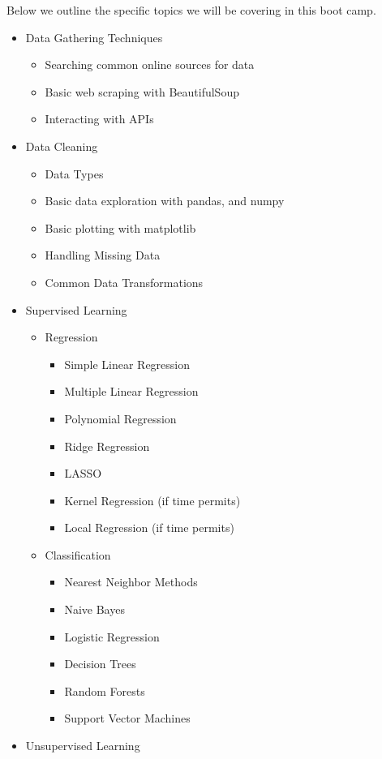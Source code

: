 \documentclass[12pt]{article}
\begin{document}
Below we outline the specific topics we will be covering in this boot camp.
\begin{itemize}
	\item Data Gathering Techniques
	\begin{itemize}
		\item Searching common online sources for data
		\item Basic web scraping with BeautifulSoup
		\item Interacting with APIs
	\end{itemize}
	\item Data Cleaning
	\begin{itemize}
		\item Data Types
		\item Basic data exploration with pandas, and numpy
		\item Basic plotting with matplotlib
		\item Handling Missing Data
		\item Common Data Transformations
	\end{itemize}
	\item Supervised Learning
	\begin{itemize}
		\item Regression
		\begin{itemize}
			\item Simple Linear Regression
			\item Multiple Linear Regression
			\item Polynomial Regression
			\item Ridge Regression
			\item LASSO
			\item Kernel Regression (if time permits)
			\item Local Regression (if time permits)
		\end{itemize}
		\item Classification
		\begin{itemize}
			\item Nearest Neighbor Methods
			\item Naive Bayes
			\item Logistic Regression
			\item Decision Trees
			\item Random Forests
			\item Support Vector Machines
		\end{itemize}
	\end{itemize}
	\item Unsupervised Learning

\end{itemize}
\end{document}
